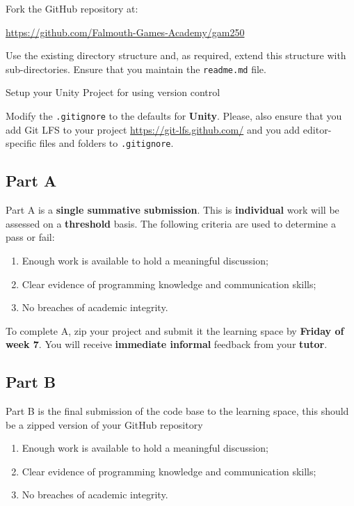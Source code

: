 \documentclass{../../fal_assignment}
\begin{document}
Fork the GitHub repository at:

\indent \url{https://github.com/Falmouth-Games-Academy/gam250}

Use the existing directory structure and, as required, extend this structure with sub-directories. Ensure that you maintain the \texttt{readme.md} file.

Setup your Unity Project for using version control \url{}

Modify the \texttt{.gitignore} to the defaults for \textbf{Unity}. Please, also ensure that you add Git LFS to your project \url{https://git-lfs.github.com/} and you add editor-specific files and folders to \texttt{.gitignore}.  

\subsection*{Part A}

Part A is a \textbf{single summative submission}. This is \textbf{individual} work will be assessed on a \textbf{threshold} basis. The following criteria are used to determine a pass or fail: 

\begin{enumerate}[label=(\alph*)]
	\item Enough work is available to hold a meaningful discussion; 
	\item Clear evidence of programming knowledge and communication skills; 
	\item No breaches of academic integrity. 
\end{enumerate}

To complete A, zip your project and submit it the learning space by \textbf{Friday of week 7}. You will receive \textbf{immediate informal} feedback from your \textbf{tutor}.

\subsection*{Part B}

Part B is the final submission of the code base to the learning space, this should be a zipped version of your GitHub repository

\begin{enumerate}[label=(\alph*)]
	\item Enough work is available to hold a meaningful discussion; 
	\item Clear evidence of programming knowledge and communication skills; 
	\item No breaches of academic integrity. 
\end{enumerate}
\end{document}
